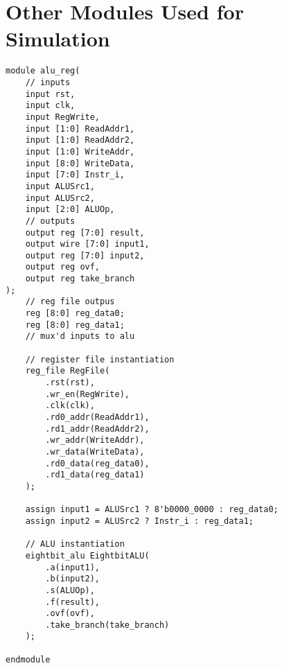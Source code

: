 \documentclass{article}
\begin{document}
\section*{Other Modules Used for Simulation}
\begin{lstlisting}[style=verilog-style]
module alu_reg(
	// inputs
	input rst, 
	input clk, 
	input RegWrite, 
	input [1:0] ReadAddr1, 
	input [1:0] ReadAddr2, 
	input [1:0] WriteAddr, 
	input [8:0] WriteData,
	input [7:0] Instr_i,
	input ALUSrc1,
	input ALUSrc2,
	input [2:0] ALUOp,
	// outputs
	output reg [7:0] result,
	output wire [7:0] input1,
	output reg [7:0] input2,
	output reg ovf,
	output reg take_branch
);
	// reg file outpus
	reg [8:0] reg_data0;
	reg [8:0] reg_data1;
	// mux'd inputs to alu

	// register file instantiation
	reg_file RegFile(
		.rst(rst),
		.wr_en(RegWrite),
		.clk(clk),
		.rd0_addr(ReadAddr1),
		.rd1_addr(ReadAddr2),
		.wr_addr(WriteAddr),
		.wr_data(WriteData),
		.rd0_data(reg_data0),
		.rd1_data(reg_data1)
	);
	
	assign input1 = ALUSrc1 ? 8'b0000_0000 : reg_data0; 
	assign input2 = ALUSrc2 ? Instr_i : reg_data1;

	// ALU instantiation
	eightbit_alu EightbitALU(
		.a(input1),
		.b(input2),
		.s(ALUOp),
		.f(result),
		.ovf(ovf),
		.take_branch(take_branch)
	);

endmodule
\end{lstlisting}
\end{document}
